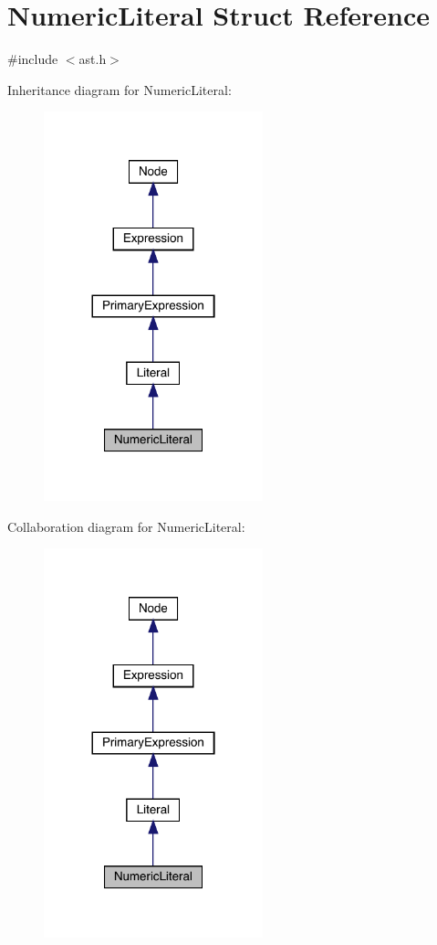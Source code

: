 \hypertarget{struct_numeric_literal}{}\section{Numeric\+Literal Struct Reference}
\label{struct_numeric_literal}


{\ttfamily \#include $<$ast.\+h$>$}



Inheritance diagram for Numeric\+Literal\+:\nopagebreak
\begin{figure}[H]
\begin{center}
\leavevmode
\includegraphics[width=180pt]{struct_numeric_literal__inherit__graph}
\end{center}
\end{figure}


Collaboration diagram for Numeric\+Literal\+:\nopagebreak
\begin{figure}[H]
\begin{center}
\leavevmode
\includegraphics[width=180pt]{struct_numeric_literal__coll__graph}
\end{center}
\end{figure}
